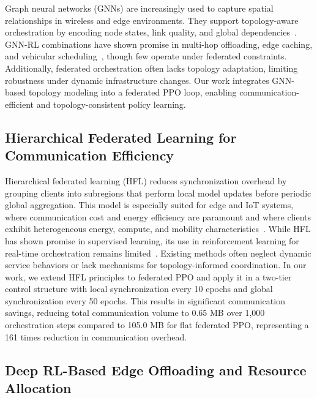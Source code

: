 \documentclass[conference]{IEEEtran}
\begin{document}
	Graph neural networks (GNNs) are increasingly used to capture spatial relationships in wireless and edge environments. They support topology-aware orchestration by encoding node states, link quality, and global dependencies~\cite{zhang2024optimizing,jere2023distributed}. GNN-RL combinations have shown promise in multi-hop offloading, edge caching, and vehicular scheduling~\cite{makris2024graphneuralnetworksreinforcement,patel2022bfledge}, though few operate under federated constraints. Additionally, federated orchestration often lacks topology adaptation, limiting robustness under dynamic infrastructure changes. Our work integrates GNN-based topology modeling into a federated PPO loop, enabling communication-efficient and topology-consistent policy learning.
	
		
	\subsection{Hierarchical Federated Learning for Communication Efficiency}
	
	Hierarchical federated learning (HFL) reduces synchronization overhead by grouping clients into subregions that perform local model updates before periodic global aggregation. This model is especially suited for edge and IoT systems, where communication cost and energy efficiency are paramount and where clients exhibit heterogeneous energy, compute, and mobility characteristics~\cite{liu2021selfadaptive,huang2023workercentric}. While HFL has shown promise in supervised learning, its use in reinforcement learning for real-time orchestration remains limited~\cite{duan2023combining}. Existing methods often neglect dynamic service behaviors or lack mechanisms for topology-informed coordination. In our work, we extend HFL principles to federated PPO and apply it in a two-tier control structure with local synchronization every 10 epochs and global synchronization every 50 epochs. This results in significant communication savings, reducing total communication volume to 0.65 MB over 1,000 orchestration steps compared to 105.0 MB for flat federated PPO, representing a 161 times reduction in communication overhead.
	
	
	\subsection{Deep RL-Based Edge Offloading and Resource Allocation}
	
\end{document}
